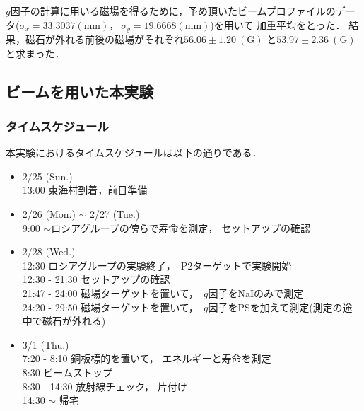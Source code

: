 $g$因子の計算に用いる磁場を得るために，予め頂いたビームプロファイルのデータ($\sigma_x=33.3037(\mathrm{mm})，\ \sigma_y=19.6668(\mathrm{mm})$)を用いて
加重平均をとった．
結果，磁石が外れる前後の磁場がそれぞれ$56.06\pm 1.20\  (\mathrm{G})$ と$53.97\pm 2.36\  (\mathrm{G})$ と求まった．
\newpage
\subsection{ビームを用いた本実験}
\subsubsection{タイムスケジュール}
本実験におけるタイムスケジュールは以下の通りである．
\begin{itemize}
\item 2/25 (Sun.)\\
  13:00   東海村到着，前日準備
\item 2/26 (Mon.) $\sim$ 2/27 (Tue.)\\
  9:00 $\sim$ロシアグループの傍らで寿命を測定， セットアップの確認
\item 2/28 (Wed.)\\
  12:30   ロシアグループの実験終了，\ P2ターゲットで実験開始\\ %
  12:30 - 21:30 セットアップの確認\\
  21:47 - 24:00 磁場ターゲットを置いて，\ $g$因子をNaIのみで測定\\
  24:20 - 29:50 磁場ターゲットを置いて，\ $g$因子をPSを加えて測定(測定の途中で磁石が外れる)%
\item 3/1 (Thu.)\\
  7:20 - 8:10 銅板標的を置いて， エネルギーと寿命を測定\\%
  8:30   ビームストップ\\%
  8:30 - 14:30 放射線チェック， 片付け \\%
  14:30 $\sim$ 帰宅
\end{itemize}
